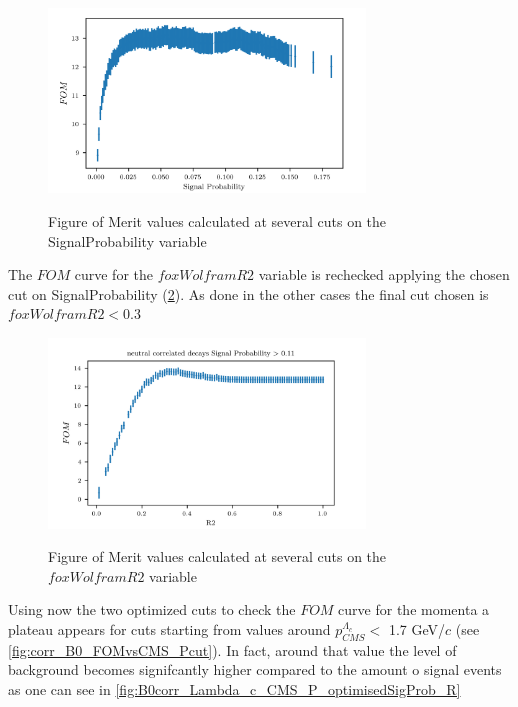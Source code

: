 \begin{figure}[H]
    {\includegraphics[width=0.75\textwidth]{03-Selection/figs/corr_B0_FOMvsSigProb_cut_until015.png}}
    \caption{Figure of Merit values calculated at several cuts on the SignalProbability variable}
    \label{fig:B0corrLambdaC_FOMvsSigProb}
    \end{figure}


The     $FOM$ curve for the $foxWolframR2$ variable is rechecked applying the chosen cut on SignalProbability
(\cref{fig:corr_B0SigProbOpt_FOMvsR2_cutRecheck}). As done in the other cases the final cut chosen is $foxWolframR2 < 0.3$ 
    \begin{figure}[H]
        {\includegraphics[width=0.75\textwidth]{03-Selection/figs/corr_B0SigProbOpt_FOMvsR2_cutRecheck.png}}
        \caption{Figure of Merit values calculated at several cuts on the $foxWolframR2$ variable}
        \label{fig:corr_B0SigProbOpt_FOMvsR2_cutRecheck}
        \end{figure}

    

 Using now the two optimized cuts to check the  $FOM$ curve for the momenta  a plateau appears for cuts starting from
 values around $p^{\Lambda_c}_{CMS} <$ 1.7 GeV/$c$ (see \cref{fig:corr_B0_FOMvsCMS_Pcut}).  In fact, around that value 
 the level of background becomes signifcantly higher compared to the amount o signal events as one can see in \cref{fig:B0corr_Lambda_c_CMS_P_optimisedSigProb_R}  


